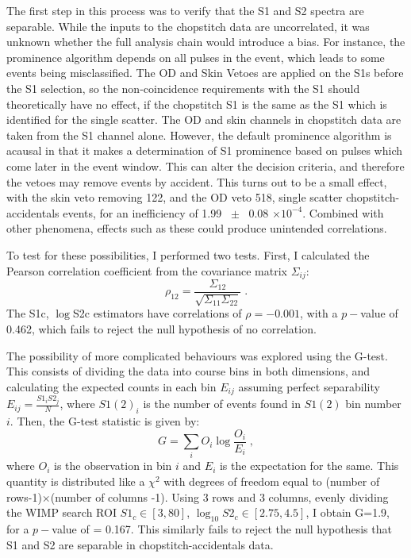 The first step in this process was to verify that the S1 and S2 spectra are separable.
While the inputs to the chopstitch data are uncorrelated, it was unknown whether the full analysis chain would introduce a bias.
For instance, the prominence algorithm depends on all pulses in the event, which leads to some events being misclassified.
The OD and Skin Vetoes are applied on the S1s before the S1 selection, so the non-coincidence requirements with the S1 should theoretically have no effect, if the chopstitch S1 is the same as the S1 which is identified for the single scatter.
The OD and skin channels in chopstitch data are taken from the S1 channel alone.
However, the default prominence algorithm is acausal in that it makes a determination of S1 prominence based on pulses which come later in the event window.
This can alter the decision criteria, and therefore the vetoes may remove events by accident.
This turns out to be a small effect, with the skin veto removing 122, and the OD veto 518, single scatter chopstitch-accidentals events, for an inefficiency of 1.99 ~$\pm$ ~0.08 $\times 10^{-4}$.
Combined with other phenomena, effects such as these could produce unintended correlations.

To test for these possibilities, I performed two tests.
First, I calculated the Pearson correlation coefficient from the covariance matrix $\Sigma_{ij}$:
\begin{equation}
    \rho_{12} = \frac{\Sigma_{12}}{\sqrt{\Sigma_{11} \Sigma_{22}}}\;.
\end{equation}
\noindent
The S1c, $\log$S2c estimators have correlations of  $\rho=-0.001$, with a $p-$value of 0.462, which fails to reject the null hypothesis of no correlation. 

The possibility of more complicated behaviours was explored using the G-test\cite{mcdonald_john_handbook_2014}.
This consists of dividing the data into course bins in both dimensions, and calculating the expected counts in each bin $E_{ij}$ assuming perfect separability $E_{ij}=\frac{S1_i S2_j}{N}$, where $S1(2)_i$ is the number of events found in $S1(2)$ bin number $i$.
Then, the G-test statistic is given by:
\begin{equation}
    G = \sum_i O_i \log \frac{O_i}{E_i}\;,
\end{equation}
\noindent
where $O_i$ is the observation in bin $i$ and $E_i$ is the expectation for the same.
This quantity is distributed like a $\chi^2$ with degrees of freedom equal to (number of rows-1)$\times$(number of columns -1).
Using 3 rows and 3 columns, evenly dividing  the WIMP search ROI $S1_c \in [3,80]$, $\log_{10} S2_c \in [2.75, 4.5]$, I obtain G=1.9, for a  $p-$value of = 0.167.
This similarly fails to reject the null hypothesis that S1 and S2 are separable in chopstitch-accidentals data.

